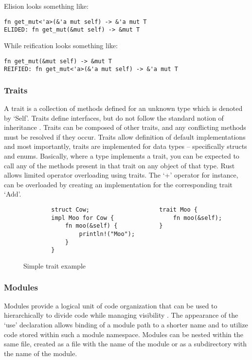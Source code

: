 \vspace{5mm}
Elision looks something like:
\begin{verbatim}
fn get_mut<'a>(&'a mut self) -> &'a mut T
ELIDED: fn get_mut(&mut self) -> &mut T
\end{verbatim}

While reification looks something like:
\begin{verbatim}
fn get_mut(&mut self) -> &mut T
REIFIED: fn get_mut<'a>(&'a mut self) -> &'a mut T
\end{verbatim}

\subsubsection{Traits}
A trait is a collection of methods defined for an unknown type which is denoted by `Self'. Traits define interfaces, but do not follow the standard notion of inheritance \cite{traitexample15}. Traits can be composed of other traits, and any conflicting methods must be resolved if they occur. Traits allow definition of default implementations and most importantly, traits are implemented for data types -- specifically structs and enums. Basically, where a type implements a trait, you can be expected to call any of the methods present in that trait on any object of that type. Rust allows limited operator overloading using traits. The `+' operator for instance, can be overloaded by creating an implementation for the corresponding trait `Add'.

\begin{figure}[H]
\centering
\begin{verbatim}
        struct Cow;                    trait Moo {
        impl Moo for Cow {                 fn moo(&self);    
            fn moo(&self) {            }
                println!("Moo");                     
            }
        }
\end{verbatim}
\caption{Simple trait example}
\end{figure}

\subsubsection{Modules}
Modules provide a logical unit of code organization that can be used to hierarchically to divide code while managing visibility \cite{docmod15}. The appearance of the `use' declaration allows binding of a module path to a shorter name and to utilize code stored within such a module namespace. Modules can be nested within the same file, created as a file with the name of the module or as a subdirectory with the name of the module.

